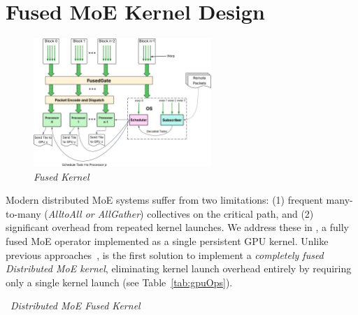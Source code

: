 \section{Fused MoE Kernel Design}\label{sec:method}
\begin{figure}
    \centering
    \includegraphics[width=0.6\textwidth, keepaspectratio]{figures/architecture}
    \caption{\emph{\sysname Fused Kernel}}
    \label{fig:fusedK}
\end{figure}
Modern distributed MoE systems suffer from two limitations: (1) frequent many-to-many
(\emph{AlltoAll or AllGather}) collectives on the critical path, and
(2) significant overhead from repeated kernel launches.
We address these in \sysname, a fully fused MoE operator implemented
as a single persistent GPU kernel.
Unlike previous approaches~\cite{comet, deepep, pmlr-v162-rajbhandari22a, megatron, MLSYS2023_5616d34c,
    MLSYS2024_339caf45, 10.1145/3503221.3508418, 10.1145/3588964, 10.1145/3627703.3650083, 10.1145/3710848.3710868,
    NEURIPS2022_67d57c32},
\sysname is the first solution to implement a \emph{completely fused Distributed MoE kernel},
eliminating kernel launch overhead entirely by requiring only a single kernel launch (see Table~\ref{tab:gpuOps}).
\begin{algorithm}[!h]
    \small
    \DontPrintSemicolon
    \caption{~\emph{\sysname Distributed MoE Fused Kernel}}\label{alg:one}
\end{algorithm}
